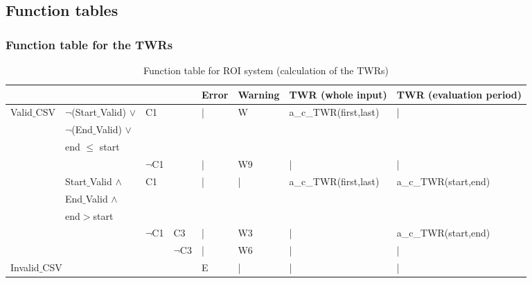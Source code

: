 \documentclass[runningheads,12pt]{article}
\begin{document}
\newpage

\subsection{Function tables}

\subsubsection{Function table for the TWRs}

\begin{landscape}
\begin{table}[H]
{
\centering

\begin{tabular}{|l|l|l|l||l|l|l|l|}
\hline
\multicolumn{4}{|c||}{} & Error & Warning &TWR (whole input) & TWR (evaluation period)\\ 

\hline
Valid$\_$CSV & $\lnot$(Start$\_$Valid) $\vee$ & \multicolumn{2}{|l||}{C1} & | & W & a\_c\_TWR(first,last) & |\\ 
& $\lnot$(End$\_$Valid) $\vee$& \multicolumn{2}{|l||}{} &&& &\\
& end $\le$ start & \multicolumn{2}{|l||}{} &&& &\\

\cline{3-8}
& & \multicolumn{2}{|l||}{$\lnot$C1} & | & W9 & | & |\\ 


\cline{2-8}
& Start$\_$Valid  $\wedge$  & \multicolumn{2}{|l||}{C1} & | & | & a\_c\_TWR(first,last) & a\_c\_TWR(start,end)\\ 
& End$\_$Valid $\wedge$  & \multicolumn{2}{|l||}{} &&&&\\
& end$>$start   & \multicolumn{2}{|l||}{}&&&&\\

\cline{3-8}
&& $\lnot$C1 & C3 & | & W3 & | & a\_c\_TWR(start,end)\\

\cline{4-8}
&& & $\lnot$C3 & | & W6 & | & |\\

\hline
\multicolumn{4}{|l||}{Invalid$\_$CSV} & E & | & | & |\\ 

\hline
\end{tabular}

\caption{Function table for ROI system (calculation of the TWRs)}
\label{table:ftable_TWR}
}
\end{table}
\end{landscape}
\end{document}
